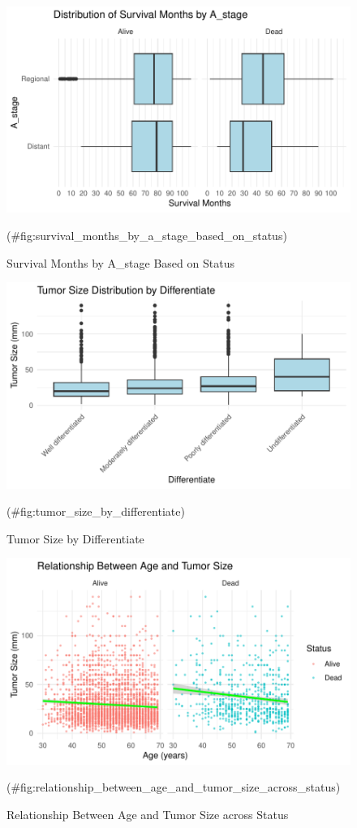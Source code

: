 \documentclass[
]{article}
\begin{document}
\begin{figure}
\includegraphics[width=0.9\linewidth]{P8130_project_report_files/figure-latex/survival_months_by_a_stage_based_on_status-1} \caption{Survival Months by A_stage Based on Status}(\#fig:survival_months_by_a_stage_based_on_status)
\end{figure}

\begin{figure}
\includegraphics[width=0.9\linewidth]{P8130_project_report_files/figure-latex/tumor_size_by_differentiate-1} \caption{Tumor Size by Differentiate}(\#fig:tumor_size_by_differentiate)
\end{figure}

\begin{figure}
\includegraphics[width=0.9\linewidth]{P8130_project_report_files/figure-latex/relationship_between_age_and_tumor_size_across_status-1} \caption{Relationship Between Age and Tumor Size across Status}(\#fig:relationship_between_age_and_tumor_size_across_status)
\end{figure}
\end{document}
